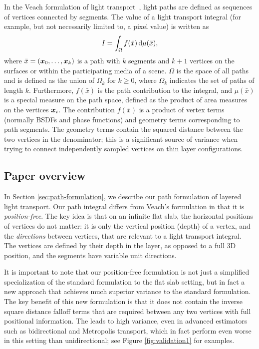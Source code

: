 In the Veach formulation of light transport~, light paths are defined as sequences of vertices connected by segments.
The value of a light transport integral (for example, but not necessarily limited to, a pixel value) is written as
%
\begin{equation}
I = \int_\Omega f(\bar x) \,\mathrm{d} \mu(\bar x),
\end{equation}
%
where $\bar x = (\bm{x}_0, \dots, \bm{x}_k)$ is a path with $k$ segments and $k + 1$ vertices on the surfaces or within the participating media of a scene.
$\Omega$ is the space of all paths and is defined as the union of $\Omega_k$ for $k \geq 0$, where $\Omega_k$ indicates the set of paths of length $k$.
Furthermore, $f(\bar x)$ is the path contribution to the integral, and $\mu(\bar x)$ is a special measure on the path space, defined as the product of area measures on the vertices $\bm{x}_i$. The contribution $f(\bar x)$ is a product of vertex terms (normally BSDFs and phase functions) and geometry terms corresponding to path segments. The geometry terms contain the squared distance between the two vertices in the denominator; this is a significant source of variance when trying to connect independently sampled vertices on thin layer configurations.


\subsection{Paper overview}

In Section \ref{sec:path-formulation}, we describe our path formulation of layered light transport. Our path integral differs from Veach's formulation in that it is \emph{position-free}. The key idea is that on an infinite flat slab, the horizontal positions of vertices do not matter: it is only the vertical position (depth) of a vertex, and the \emph{directions} between vertices, that are relevant to a light transport integral. The vertices are defined by their depth in the layer, as opposed to a full 3D position, and the segments have variable unit directions.

It is important to note that our position-free formulation is not just a simplified specialization of the standard formulation to the flat slab setting, but in fact a new approach that achieves much superior variance to the standard formulation. The key benefit of this new formulation is that it does not contain the inverse square distance falloff terms that are required between any two vertices with full positional information. The leads to high variance, even in advanced estimators such as bidirectional and Metropolis transport, which in fact perform even worse in this setting than unidirectional; see Figure \ref{fig:validation1} for examples.


